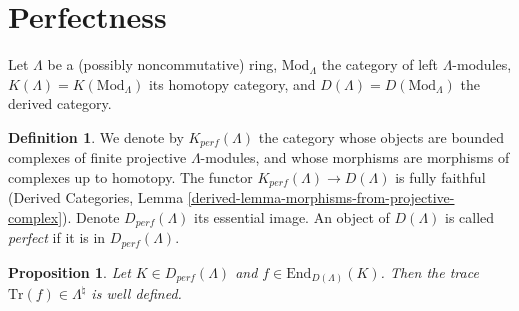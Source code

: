 \documentclass{stacks-project}
\theoremstyle{plain}
\newtheorem{proposition}[subsection]{Proposition}
\theoremstyle{definition}
\newtheorem{definition}[subsection]{Definition}
\theoremstyle{remark}
\numberwithin{equation}{subsection}
\begin{document}
\section{Perfectness}
\label{section-perfect}

\noindent
Let $\Lambda$ be a (possibly noncommutative) ring, $\text{Mod}_{\Lambda}$ the
category of left $\Lambda$-modules, $K(\Lambda) = K(\text{Mod}_\Lambda)$ its
homotopy category, and $D(\Lambda)= D(\text{Mod}_\Lambda)$ the derived
category.

\begin{definition}
\label{definition-perfect}
We denote by $K_{perf}(\Lambda)$ the category whose objects are bounded
complexes of finite projective $\Lambda$-modules, and whose morphisms are
morphisms of complexes up to homotopy. The functor $K_{perf}(\Lambda)\to
D(\Lambda)$ is fully faithful (Derived Categories, Lemma
\ref{derived-lemma-morphisms-from-projective-complex}).
Denote $D_{perf}(\Lambda)$ its essential image.
An object of $D(\Lambda)$ is called {\it perfect} if it is in
$D_{perf}(\Lambda)$.
\end{definition}

\begin{proposition}
\label{proposition-trace-well-defined}
Let $K\in D_{perf}(\Lambda)$ and $f\in \text{End}_{D(\Lambda)}(K)$. Then the
trace $\text{Tr}(f)\in \Lambda^\natural$ is well defined.
\end{proposition}
\end{document}
